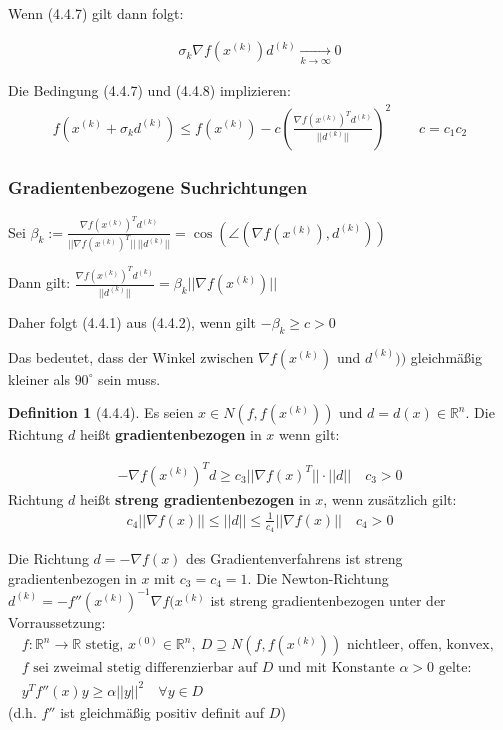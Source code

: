 \documentclass[ngerman,halfparskip]{scrartcl}
\theoremstyle{definition}
\newtheorem*{defin}{Definition}
\def\R{\mathbb R}
\begin{document}
Wenn (4.4.7) gilt dann folgt:

\begin{gather*}
\sigma_k\nabla f(x^{(k)})d^{(k)}\xrightarrow[k\rightarrow \infty]{}0
\end{gather*}


Die Bedingung (4.4.7) und (4.4.8) implizieren:
\begin{gather*}\tag{4.4.6}
f(x^{(k)}+\sigma_kd^{(k)})\leq f(x^{(k)}) - c\left( \frac{\nabla f(x^{(k)})^Td^{(k)}}{||d^{(k)}||} \right)^2 \qquad c=c_1c_2
\end{gather*}

\subsubsection*{Gradientenbezogene Suchrichtungen}
Sei $\beta_k:=\frac{\nabla f(x^{(k)})^Td^{(k)}}{||\nabla f(x^{(k)})^T||~||d^{(k)}||}=\cos(\angle(\nabla f(x^{(k)}),d^{(k)}))$

Dann gilt: $\frac{\nabla f(x^{(k)})^Td^{(k)}}{||d^{(k)}||}=\beta_k ||\nabla f(x^{(k)})||$

Daher folgt (4.4.1) aus (4.4.2), wenn gilt $-\beta_k \geq c>0$

Das bedeutet, dass der Winkel zwischen $\nabla f(x^{(k)})$ und $d^{(k)}))$ gleichmäßig kleiner als $90^\circ$ sein muss.

\begin{defin}[4.4.4]
Es seien $x\in N(f,f(x^{(k)}))$ und $d=d(x)\in\R^n$. Die Richtung $d$ heißt \textbf{gradientenbezogen} in $x$ wenn gilt:

\begin{gather*}
\tag{4.4.11}-\nabla f(x^{(k)})^Td\geq c_3 ||\nabla f(x)^T||\cdot ||d|| \quad c_3>0
\end{gather*}
Richtung $d$ heißt \textbf{streng gradientenbezogen} in $x$, wenn zusätzlich gilt:
\begin{gather*}
\tag{4.4.12}c_4||\nabla f(x)||\leq ||d||\leq \frac 1{c_4}||\nabla f(x)|| \quad c_4>0
\end{gather*}
\end{defin}

Die Richtung $d=-\nabla f(x)$ des Gradientenverfahrens ist streng gradientenbezogen in $x$ mit $c_3=c_4=1$.
Die Newton-Richtung $d^{(k)}=-f''(x^{(k)})^{-1}\nabla f(x^{(k)}$ ist streng gradientenbezogen unter der Vorraussetzung:
\begin{gather*}
\tag{4.4.13} f:\R^n\rightarrow\R \text{ stetig, }x^{(0)}\in\R^n, ~D\supseteq N(f,f(x^{(k)})) \text{ nichtleer, offen, konvex, }
\\ \text{$f$ sei zweimal stetig differenzierbar auf $D$ und mit Konstante $\alpha>0$ gelte:}\\
y^Tf''(x)y\geq \alpha ||y||^2 \quad \forall y\in D
\end{gather*}
(d.h. $f''$ ist gleichmäßig positiv definit auf $D$)
\end{document}
